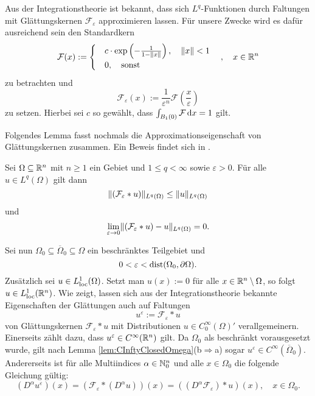 Aus der Integrationstheorie ist bekannt, dass sich $L^q$-Funktionen durch Faltungen mit Glättungskernen $\mathcal{F}_\varepsilon$ approximieren lassen.
Für unsere Zwecke wird es dafür ausreichend sein den Standardkern
$$
\mathcal{F}(x) := \begin{cases}
                     & c \cdot \exp\left(-\frac{1}{1 - \lVert x \rVert}\right), \quad \lVert x \rVert < 1 \\
                     & 0, \quad  \text{sonst}
                  \end{cases} \quad,\quad x \in \mathbb{R}^n
$$
zu betrachten und
$$
\mathcal{F}_\varepsilon(x) := \frac{1}{\varepsilon^n} \mathcal{F}\left(\frac{x}{\varepsilon}\right)
$$ 
zu setzen.
Hierbei sei $c$ so gewählt, dass $\int_{B_1(0)} \mathcal{F} \, {\operatorname{d}\!{x}} = 1$ gilt.

Folgendes Lemma fasst nochmals die Approximationseigenschaft von Glättungskernen zusammen. Ein Beweis findet sich in \cite[S.36, Theorem 2.29(c)]{adams2003sobolev}.
\begin{lem}
  \label{lem:mollification}
  Sei $\Omega \subseteq \mathbb{R}^n$ mit $n \geq 1$ ein Gebiet und $1 \leq q < \infty$ sowie $\varepsilon > 0$.
  Für alle $u \in L^q(\Omega)$ gilt dann
  $$
  \lVert (\mathcal{F}_\varepsilon \ast u) \rVert_{L^q(\Omega)} \leq  \lVert u \rVert_{L^q(\Omega)}
  $$
  und
  \begin{displaymath}
    \lim_{\varepsilon \to 0} \lVert (\mathcal{F}_\varepsilon \ast u) - u \rVert_{L^q(\Omega)} = 0. 
  \end{displaymath}
\end{lem}

Sei nun $\Omega_0 \subseteq \overline\Omega_0 \subseteq \Omega$ ein beschränktes Teilgebiet und
\begin{equation}
  \label{eq:convolutionEpsilon}
  0 < \varepsilon < \operatorname{dist}(\Omega_0, \partial\Omega).
\end{equation}
Zusätzlich sei $u \in L^1_{\operatorname{loc}}(\Omega)$.
Setzt man $u(x) := 0$ für alle $x \in \mathbb{R}^n \setminus \Omega$, so folgt $u \in L^1_{\operatorname{loc}}(\mathbb{R}^n)$.
Wie \cite[S.171, Theorem 6.30(b)]{rudin1991fa} zeigt, lassen sich aus der Integrationstheorie bekannte Eigenschaften der Glättungen auch auf Faltungen 
$$
u^\varepsilon := \mathcal{F}_\varepsilon \ast u
$$
von Glättungskernen $\mathcal{F}_\varepsilon \ast u$ mit Distributionen $u \in C_0^\infty(\Omega)'$ verallgemeinern.
Einerseits zählt dazu, dass $u^\varepsilon \in C^\infty(\mathbb{R}^n)$ gilt.
Da $\Omega_0$ als beschränkt vorausgesetzt wurde, gilt nach Lemma \ref{lem:CInftyClosedOmega}(b$\Rightarrow$a) sogar $u^\varepsilon \in C^\infty(\overline\Omega_0)$.
Andererseits ist für alle Multiindices $\alpha \in \mathbb{N}_0^n$ und alle $x \in \Omega_0$ die folgende Gleichung gültig:
\begin{equation}
  \label{eq:convolutionDiff}
  (D^\alpha u^\varepsilon)(x) 
  = (\mathcal{F}_\varepsilon \ast (D^\alpha u))(x)
  = ( (D^\alpha \mathcal{F}_\varepsilon) \ast u)(x), \quad x \in \Omega_0.
\end{equation}

